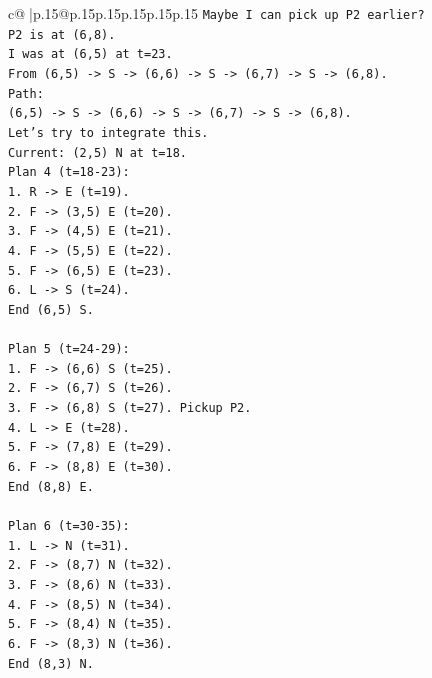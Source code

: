 \documentclass{article}
\begin{document}
{\begin{supertabular}{c@{$\;$}|p{.15\linewidth}@{}p{.15\linewidth}p{.15\linewidth}p{.15\linewidth}p{.15\linewidth}p{.15\linewidth}}
{{{\texttt{Maybe I can pick up P2 earlier?} \\
\texttt{P2 is at (6,8).} \\
\texttt{I was at (6,5) at t=23.} \\
\texttt{From (6,5) {-}> S {-}> (6,6) {-}> S {-}> (6,7) {-}> S {-}> (6,8).} \\
\texttt{Path:} \\
\texttt{(6,5) {-}> S {-}> (6,6) {-}> S {-}> (6,7) {-}> S {-}> (6,8).} \\
\texttt{Let's try to integrate this.} \\
\texttt{Current: (2,5) N at t=18.} \\
\texttt{Plan 4 (t=18{-}23):} \\
\texttt{1. R {-}> E (t=19).} \\
\texttt{2. F {-}> (3,5) E (t=20).} \\
\texttt{3. F {-}> (4,5) E (t=21).} \\
\texttt{4. F {-}> (5,5) E (t=22).} \\
\texttt{5. F {-}> (6,5) E (t=23).} \\
\texttt{6. L {-}> S (t=24).} \\
\texttt{End (6,5) S.} \\
\\ 
\texttt{Plan 5 (t=24{-}29):} \\
\texttt{1. F {-}> (6,6) S (t=25).} \\
\texttt{2. F {-}> (6,7) S (t=26).} \\
\texttt{3. F {-}> (6,8) S (t=27). Pickup P2.} \\
\texttt{4. L {-}> E (t=28).} \\
\texttt{5. F {-}> (7,8) E (t=29).} \\
\texttt{6. F {-}> (8,8) E (t=30).} \\
\texttt{End (8,8) E.} \\
\\ 
\texttt{Plan 6 (t=30{-}35):} \\
\texttt{1. L {-}> N (t=31).} \\
\texttt{2. F {-}> (8,7) N (t=32).} \\
\texttt{3. F {-}> (8,6) N (t=33).} \\
\texttt{4. F {-}> (8,5) N (t=34).} \\
\texttt{5. F {-}> (8,4) N (t=35).} \\
\texttt{6. F {-}> (8,3) N (t=36).} \\
\texttt{End (8,3) N.} \\
\\ 
}}}
\end{supertabular}}
\end{document}
